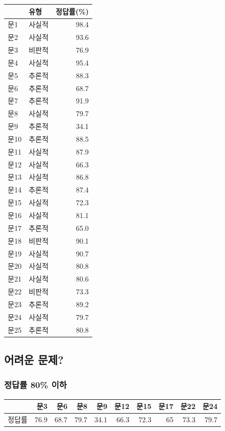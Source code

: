 \documentclass[
]{article}
\begin{document}
\begin{longtable}[]{@{}llr@{}}
\toprule\noalign{}
& 유형 & 정답률(\%) \\
\midrule\noalign{}
\endhead
\bottomrule\noalign{}
\endlastfoot
문1 & 사실적 & 98.4 \\
문2 & 사실적 & 93.6 \\
문3 & 비판적 & 76.9 \\
문4 & 사실적 & 95.4 \\
문5 & 추론적 & 88.3 \\
문6 & 추론적 & 68.7 \\
문7 & 추론적 & 91.9 \\
문8 & 사실적 & 79.7 \\
문9 & 추론적 & 34.1 \\
문10 & 추론적 & 88.5 \\
문11 & 사실적 & 87.9 \\
문12 & 사실적 & 66.3 \\
문13 & 사실적 & 86.8 \\
문14 & 추론적 & 87.4 \\
문15 & 사실적 & 72.3 \\
문16 & 사실적 & 81.1 \\
문17 & 추론적 & 65.0 \\
문18 & 비판적 & 90.1 \\
문19 & 사실적 & 90.7 \\
문20 & 사실적 & 80.8 \\
문21 & 사실적 & 80.6 \\
문22 & 비판적 & 73.3 \\
문23 & 추론적 & 89.2 \\
문24 & 사실적 & 79.7 \\
문25 & 추론적 & 80.8 \\
\end{longtable}

\subsection{어려운 문제?}\label{uxc5b4uxb824uxc6b4-uxbb38uxc81c}

\subsubsection{정답률 80\%
이하}\label{uxc815uxb2f5uxb960-80-uxc774uxd558}

\begin{longtable}[]{@{}lrrrrrrrrr@{}}
\toprule\noalign{}
& 문3 & 문6 & 문8 & 문9 & 문12 & 문15 & 문17 & 문22 & 문24 \\
\midrule\noalign{}
\endhead
\bottomrule\noalign{}
\endlastfoot
정답률 & 76.9 & 68.7 & 79.7 & 34.1 & 66.3 & 72.3 & 65 & 73.3 & 79.7 \\
\end{longtable}
\end{document}
